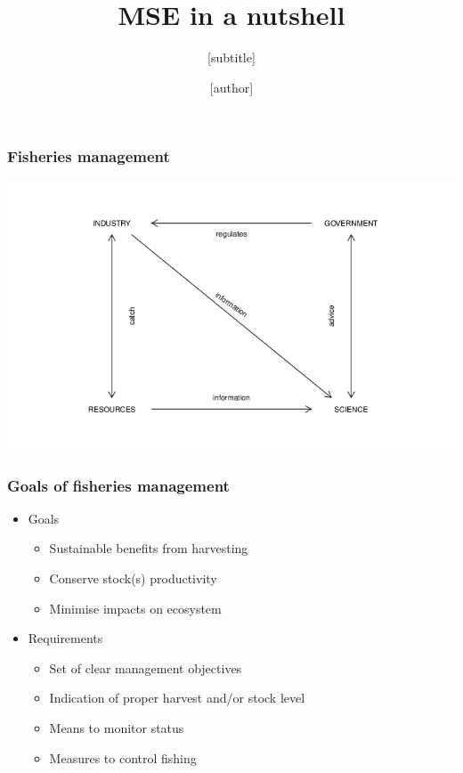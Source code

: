 \documentclass{beamer}
\title{MSE in a nutshell}
\subtitle{[subtitle]}
\author{[author] \\ \normalfont {\scriptsize \href{mailto:jdoe@doe.com}{<[email]>}}}
\institute{[affiliation]}
\begin{document}
\begin{frame}
\titlepage

\end{frame}

\begin{frame}
\frametitle{Fisheries management}

\centering
\includegraphics[height=0.8\textheight]{figs/fmanag}

\end{frame}

\begin{frame}
\frametitle{Goals of fisheries management}

\begin{itemize}
  \item Goals
  \begin{itemize}
    \item Sustainable benefits from harvesting
    \item Conserve stock(s) productivity
    \item Minimise impacts on ecosystem
  \end{itemize}
 \bigskip
    \item Requirements
  \begin{itemize}
    \item Set of clear management objectives
    \item Indication of proper harvest and/or stock level
    \item Means to monitor status
    \item Measures to control fishing
  \end{itemize}
\end{itemize}

\end{frame}
\end{document}
